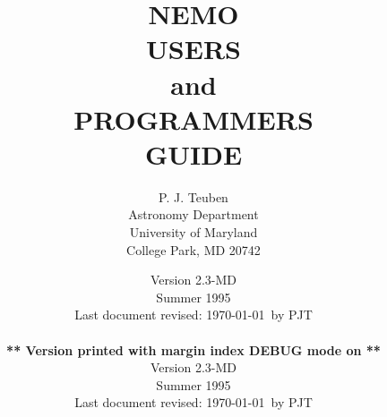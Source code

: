 
\ifdebug
 \ifindex
 \else
 \fi
\else
 \ifindex
 \else 
 \fi
\fi


\makeindex

\title{ {\Huge NEMO} \\
           {\LARGE USERS \\ 
                   and \\
               PROGRAMMERS \\ 
                  GUIDE}}


\author{
 {P. J. Teuben} \\
 {Astronomy Department} \\
 {University of Maryland} \\
 {College Park, MD 20742}
       }

\ifdebug
\date{{\small Version 2.3-MD} \\
      {\small Summer 1995} \\
      {\small Last document revised: \today\ by PJT} \\ \\
      {\bf *** Version printed with margin index DEBUG mode on **}\\
     }
\else
\date{{\small Version 2.3-MD} \\
      {\small Summer 1995} \\
      {\small Last document revised: \today\ by PJT}
     }
\fi


